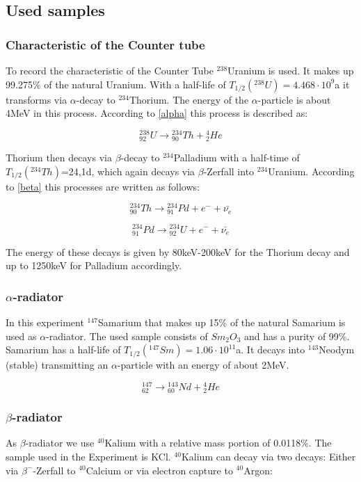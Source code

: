 \documentclass[12pt]{article}
\begin{document}
\subsection{Used samples}

\subsubsection{Characteristic of the Counter tube}\label{uranium}
To record the characteristic of the Counter Tube ${}^{238}$Uranium is used. It makes up 99.275\% of the natural Uranium.
With a half-life of $T_{1/2}({}^{238}U)=4.468\cdot 10^9$a it transforms via  $\alpha$-decay to ${}^{234}$Thorium. The energy of the $\alpha$-particle is about 4MeV in this process. According to \ref{alpha} this process is described as:

\[{}^{238}_{92}U \rightarrow {}^{234}_{90}Th + {}^4_2He\]

Thorium then decays via $\beta$-decay  to ${}^{234}$Palladium with a half-time of  $T_{1/2}({}^{234}Th)$=24,1d, which again decays via  $\beta$-Zerfall into ${}^{234}$Uranium. According to \ref{beta} this processes are written as follows:

\[{}^{234}_{90}Th \rightarrow {}^{234}_{91}Pd + e^- + \bar{\nu_e}\]

\[{}^{234}_{91}Pd \rightarrow {}^{234}_{92}U + e^- + \bar{\nu_e}\]

The energy of these decays is given by 80keV-200keV for the Thorium decay and up to 1250keV for Palladium accordingly.


\subsubsection{$\alpha$-radiator}

In this experiment ${}^{147}$Samarium that makes up 15\% of the natural Samarium is used as $\alpha$-radiator. The used sample consists of $Sm_2O_3$ and has a purity of 99\%. Samarium has a half-life of  $T_{1/2}({}^{147}Sm)=1.06\cdot10^{11}$a. It decays into ${}^{143}$Neodym (stable) transmitting an $\alpha$-particle with an energy of about 2MeV.

\[{}^{147}_{62} \rightarrow {}^{143}_{60}Nd + {}^4_2He\]

\subsubsection{$\beta$-radiator}
As $\beta$-radiator we use ${}^{40}$Kalium with a relative  mass portion of 0.0118\%. The sample used in the Experiment is KCl. 
${}^{40}$Kalium can decay via two decays: Either via $\beta^-$-Zerfall to ${}^{40}$Calcium or via electron capture to ${}^{40}$Argon:
\end{document}
